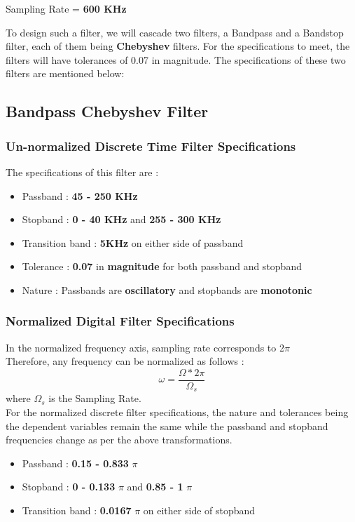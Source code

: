 \documentclass{article}
\begin{document}
Sampling Rate = \textbf{600 KHz}\\
\noindent

To design such a filter, we will cascade two filters, a Bandpass and a Bandstop filter, each of them being \textbf{Chebyshev} filters. For the specifications to meet, the filters will have tolerances of 0.07 in magnitude.
The specifications of these two filters are mentioned below:

\subsection{\textbf{Bandpass Chebyshev Filter}}
\subsubsection{\textbf{Un-normalized Discrete Time Filter Specifications}}

\noindent
The specifications of this filter are :
\begin{itemize}
    \item Passband : \textbf{45 - 250 KHz}
    \item Stopband : \textbf{0 - 40 KHz} and \textbf{255 - 300 KHz}
    \item  Transition band : \textbf{5KHz} on either side of passband
    \item  Tolerance : \textbf{0.07} in \textbf{magnitude} for both passband and stopband
    \item  Nature : Passbands are \textbf{oscillatory} and stopbands are \textbf{monotonic}
\end{itemize}

\subsubsection{Normalized Digital Filter Specifications}

In the normalized frequency axis, sampling rate corresponds to 2$\pi$\\
Therefore, any frequency can be normalized as follows :
\begin{equation*}
    \omega = \frac{\Omega*2\pi}{\Omega_s}
\end{equation*}
where $\Omega_s$ is the Sampling Rate.\\

\vspace{1em}
\noindent
For the normalized discrete filter specifications, the nature and tolerances being the dependent variables remain the same while the passband and stopband frequencies change as per the above transformations. 
\begin{itemize}
    \item Passband : \textbf{0.15 - 0.833} {$\pi$}
    \item Stopband : \textbf{0 -  0.133} {$\pi$} and \textbf{0.85 - 1} {$\pi$}
    \item  Transition band : \textbf{0.0167} $\pi$ on either side of stopband
\end{itemize}
\end{document}
